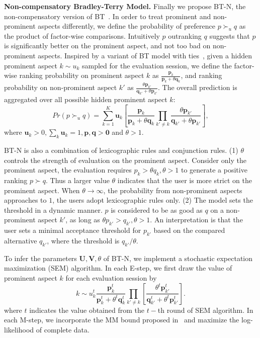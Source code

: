 \documentclass[letterpaper]{article} %
\begin{document}
\textbf{Non-compensatory Bradley-Terry Model.} Finally we propose BT-N, the non-compensatory version of BT~\cite{Hu2016Improved}. In order to treat prominent and non-prominent aspects differently, we define the probability of preference $p\succ_u q$ as the product of factor-wise comparisons. Intuitively $p$ outranking $q$ suggests that $p$ is significantly better on the prominent aspect, and not too bad on non-prominent aspects. Inspired by a variant of BT model with ties~\cite{Hunter2004MM}, given a hidden prominent aspect $k\sim u_k$ sampled for the evaluation session, we define the factor-wise ranking probability on prominent aspect $k$ as ${\frac{\mathbf{p}_k}{\mathbf{p}_k+\theta \mathbf{q}_k}}$, and ranking probability on non-prominent aspect $k'$ as $ \frac{\theta \mathbf{p}_{k'}}{\mathbf{q}_{k'}+\theta \mathbf{p}_{k'}}$. The overall prediction is aggregated over all possible hidden prominent aspect $k$:
\begin{equation}\label{equ:BT-N}
Pr(p\succ_u q)  =  \sum_{k=1}^{K} \mathbf{u}_k [ {\frac{\mathbf{p}_k}{\mathbf{p}_k+\theta \mathbf{q}_k}}\prod_{k'\neq k}{ \frac{\theta \mathbf{p}_{k'}}{\mathbf{q}_{k'}+\theta \mathbf{p}_{k'}}}],
\end{equation}
where $\mathbf{u}_k >0, \sum_k \mathbf{u}_k=1,\mathbf{p,q}>\mathbf{0}$ and $\theta>1$.  

BT-N is also a combination of lexicographic rules and conjunction rules. (1) $\theta$ controls the strength of evaluation on the prominent aspect. Consider only the prominent aspect, the evaluation requires $p_{k} > \theta q_{k}, \theta>1$ to generate a positive ranking $p\succ q$. Thus a larger value $\theta$ indicates that the user is more strict on the prominent aspect. When $\theta \rightarrow \infty$, the probability from non-prominent aspects  approaches to $1$, the users adopt lexicographic rules only. (2) The model sets the threshold in a dynamic manner. $p$ is considered to be as good as $q$ on a non-prominent aspect $k'$, as long as $\theta p_{k'} >  q_{k'},\theta>1$.  An interpretation is that the user sets a minimal acceptance threshold for $p_{k'}$ based on the compared alternative $q_{k'}$, where the threshold is $q_{k'}/\theta$.  

To infer the parameters $\mathbf{U},\mathbf{V},\theta$ of BT-N, we implement a stochastic expectation maximization (SEM) algorithm. In each E-step, we first draw the value of prominent aspect $k$ for each evaluation session by
 \begin{equation}
 k \sim u_k^{t} \frac{\mathbf{p}_{k}^t} {\mathbf{p}_{k}^t+\theta^t \mathbf{q}_{k}^t} \prod_{k'\neq k}  [\frac{\theta^t \mathbf{p}_{k'}^t} {\mathbf{q}_{k'}^t + \theta^t \mathbf{p}_{k'}^t}].
 \end{equation}
 where $t$ indicates the value obtained from the $t-$th round of SEM algorithm.
 In each M-step, we incorporate the MM bound proposed in~\cite{Hunter2004MM} and maximize the log-likelihood of complete data. 
\end{document}
